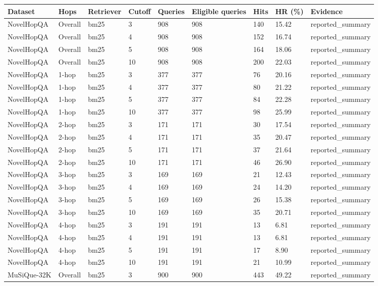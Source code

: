 \begin{tabular}{lllllllll}
\hline
Dataset & Hops & Retriever & Cutoff & Queries & Eligible queries & Hits & HR (\%) & Evidence \\
\hline
NovelHopQA & Overall & bm25 & 3 & 908 & 908 & 140 & 15.42 & reported\_summary \\
NovelHopQA & Overall & bm25 & 4 & 908 & 908 & 152 & 16.74 & reported\_summary \\
NovelHopQA & Overall & bm25 & 5 & 908 & 908 & 164 & 18.06 & reported\_summary \\
NovelHopQA & Overall & bm25 & 10 & 908 & 908 & 200 & 22.03 & reported\_summary \\
NovelHopQA & 1-hop & bm25 & 3 & 377 & 377 & 76 & 20.16 & reported\_summary \\
NovelHopQA & 1-hop & bm25 & 4 & 377 & 377 & 80 & 21.22 & reported\_summary \\
NovelHopQA & 1-hop & bm25 & 5 & 377 & 377 & 84 & 22.28 & reported\_summary \\
NovelHopQA & 1-hop & bm25 & 10 & 377 & 377 & 98 & 25.99 & reported\_summary \\
NovelHopQA & 2-hop & bm25 & 3 & 171 & 171 & 30 & 17.54 & reported\_summary \\
NovelHopQA & 2-hop & bm25 & 4 & 171 & 171 & 35 & 20.47 & reported\_summary \\
NovelHopQA & 2-hop & bm25 & 5 & 171 & 171 & 37 & 21.64 & reported\_summary \\
NovelHopQA & 2-hop & bm25 & 10 & 171 & 171 & 46 & 26.90 & reported\_summary \\
NovelHopQA & 3-hop & bm25 & 3 & 169 & 169 & 21 & 12.43 & reported\_summary \\
NovelHopQA & 3-hop & bm25 & 4 & 169 & 169 & 24 & 14.20 & reported\_summary \\
NovelHopQA & 3-hop & bm25 & 5 & 169 & 169 & 26 & 15.38 & reported\_summary \\
NovelHopQA & 3-hop & bm25 & 10 & 169 & 169 & 35 & 20.71 & reported\_summary \\
NovelHopQA & 4-hop & bm25 & 3 & 191 & 191 & 13 & 6.81 & reported\_summary \\
NovelHopQA & 4-hop & bm25 & 4 & 191 & 191 & 13 & 6.81 & reported\_summary \\
NovelHopQA & 4-hop & bm25 & 5 & 191 & 191 & 17 & 8.90 & reported\_summary \\
NovelHopQA & 4-hop & bm25 & 10 & 191 & 191 & 21 & 10.99 & reported\_summary \\
MuSiQue-32K & Overall & bm25 & 3 & 900 & 900 & 443 & 49.22 & reported\_summary \\

\end{tabular}
